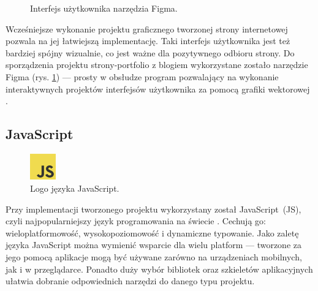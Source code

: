 \documentclass[12pt]{article}
\numberwithin{figure}{section}
\begin{document}
\begin{sloppypar}
\begin{figure}[H] 
    \centering
   \caption{Interfejs użytkownika narzędzia Figma.}
   \label{fig:figma-1.jpg}
\end{figure}

Wcześniejsze wykonanie projektu graficznego tworzonej strony internetowej pozwala na jej łatwiejszą implementację. Taki interfejs użytkownika jest też bardziej spójny wizualnie, co jest ważne dla pozytywnego odbioru strony. Do sporządzenia projektu strony-portfolio z blogiem wykorzystane zostało narzędzie Figma (rys. \ref{fig:figma-1.jpg}) --- prosty w obsłudze program pozwalający na wykonanie interaktywnych projektów interfejsów użytkownika za pomocą grafiki wektorowej \cite{figma}. 


\subsection*{JavaScript}

\begin{figure}[H] 
    \centering
        \includegraphics[width=0.1\textwidth]{images/js-logo.png}
   \caption{Logo języka JavaScript.}
\end{figure}

Przy implementacji tworzonego projektu wykorzystany został JavaScript~(JS), czyli najpopularniejszy język programowania na świecie \cite{js}. Cechują go: wieloplatformowość, wysokopoziomowość i dynamiczne typowanie. Jako zaletę języka JavaScript można wymienić wsparcie dla wielu platform --- tworzone za jego pomocą aplikacje mogą być używane zarówno na urządzeniach mobilnych, jak i w przeglądarce. Ponadto duży wybór bibliotek oraz szkieletów aplikacyjnych ułatwia dobranie odpowiednich narzędzi do danego typu projektu.


\end{sloppypar}
\end{document}
